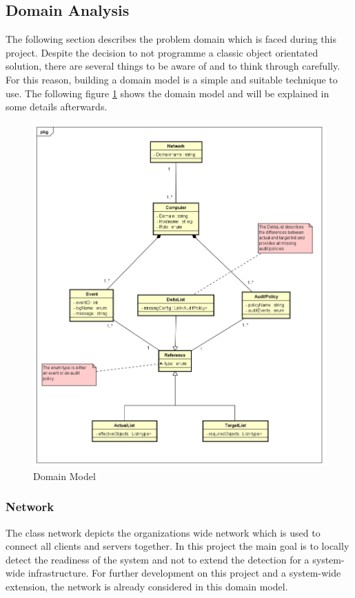 \subsection{Domain Analysis} \label{DomainAnalysis}
The following section describes the problem domain which is faced during this project. Despite the decision to not programme a classic object orientated solution, there are several things to be aware of and to think through carefully. For this reason, building a domain model is a simple and suitable technique to use. The following figure \ref{fig:domainmodel} shows the domain model and will be explained in some details afterwards. 
\begin{figure}[H]
    \centering
    \includegraphics[width=0.95\linewidth]{assets/architecture/DomainModelSRI.png}
    \caption{Domain Model}\label{fig:domainmodel}
\end{figure}

\subsubsection{Network}
The class network depicts the organizations wide network which is used to connect all clients and servers together. In this project the main goal is to locally detect the readiness of the system and not to extend the detection for a system-wide infrastructure. For further development on this project and a system-wide extension, the network is already considered in this domain model.

